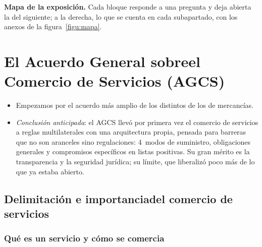 \documentclass[11pt]{article}
\begin{document}
\begin{anotaciones}
\textbf{Mapa de la exposición.} Cada bloque responde a una pregunta y deja abierta la del siguiente; a la derecha, lo que se cuenta en cada subapartado, con los anexos de la figura~\ref{figu:mapa}.
\begin{infografiacaja}
\caption{Mapa del tema: la pregunta de cada bloque y el hilo que los une}\label{figu:mapa-tema}
\end{infografiacaja}
\end{anotaciones}


\section{El Acuerdo General sobre\cortetitulo el Comercio de Servicios (AGCS)}\label{sec:agcs}

\begin{itemize}
\item Empezamos por el acuerdo más amplio de los distintos de los de mercancías.
\item \emph{Conclusión anticipada}: el AGCS llevó por primera vez el comercio de servicios a reglas multilaterales con una arquitectura propia, pensada para barreras que no son aranceles sino regulaciones: 4~modos de suministro, obligaciones generales y compromisos específicos en listas positivas. Su gran mérito es la transparencia y la seguridad jurídica; su límite, que liberalizó poco más de lo que ya estaba abierto.
\end{itemize}

\subsection{Delimitación e importancia\cortetitulo del comercio de servicios}\label{sec:servicios-importancia}

\subsubsection{Qué es un servicio y cómo se comercia}\label{sec:modos}
\end{document}
